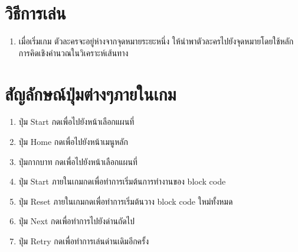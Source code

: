 \section{วิธีการเล่น}
\begin{enumerate}
    \item เมื่อเริ่มเกม ตัวละครจะอยู่ห่างจากจุดหมายระยะหนึ่ง ให้นำพาตัวละครไปยังจุดหมายโดยใช้หลักการคิดเชิงคำนวณในวิเคราะห์เส้นทาง 
    
\end{enumerate}

\section{สัญลักษณ์ปุ่มต่างๆภายในเกม}
\begin{enumerate}
    \item ปุ่ม Start กดเพื่อไปยังหน้าเลือกแผนที่
    \item ปุ่ม Home กดเพื่อไปยังหน้าเมนูหลัก
    \item ปุ่มกากบาท กดเพื่อไปยังหน้าเลือกแผนที่
    \item ปุ่ม Start ภายในเกมกดเพื่อทำการเริ่มต้นการทำงานของ block code
    \item ปุ่ม Reset ภายในเกมกดเพื่อทำการเริ่มต้นวาง block code ใหม่ทั้งหมด
    \item ปุ่ม Next กดเพื่อทำการไปยังด่านถัดไป
    \item ปุ่ม  Retry กดเพื่อทำการเล่นด่านเดิมอีกครั้ง
    
\end{enumerate}

